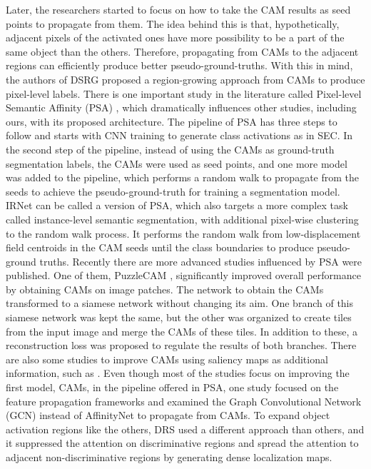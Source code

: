 \documentclass[sn-mathphys]{sn-jnl}
\theoremstyle{thmstyleone}
\theoremstyle{thmstyletwo}\newtheorem{example}{Example}\newtheorem{remark}{Remark}
\theoremstyle{thmstylethree}\newtheorem{definition}{Definition}
\begin{document}
Later, the researchers started to focus on how to take the CAM results as seed points to propagate from them. The idea behind this is that, hypothetically, adjacent pixels of the activated ones have more possibility to be a part of the same object than the others. Therefore, propagating from CAMs to the adjacent regions can efficiently produce better pseudo-ground-truths. With this in mind, the authors of DSRG \cite{huang2018dsrg} proposed a region-growing approach from CAMs to produce pixel-level labels. There is one important study in the literature called Pixel-level Semantic Affinity (PSA) \cite{DBLP:journals/corr/abs-1803-10464}, which dramatically influences other studies, including ours, with its proposed architecture. The pipeline of PSA has three steps to follow and starts with CNN training to generate class activations as in SEC. In the second step of the pipeline, instead of using the CAMs as ground-truth segmentation labels, the CAMs were used as seed points, and one more model was added to the pipeline, which performs a random walk to propagate from the seeds to achieve the pseudo-ground-truth for training a segmentation model. IRNet \cite{DBLP:journals/corr/abs-1904-05044} can be called a version of PSA, which also targets a more complex task called instance-level semantic segmentation, with additional pixel-wise clustering to the random walk process. It performs the random walk from low-displacement field centroids in the CAM seeds until the class boundaries to produce pseudo-ground truths. Recently there are more advanced studies influenced by PSA were published. One of them, PuzzleCAM \cite{jo2021puzzlecam}, significantly improved overall performance by obtaining CAMs on image patches. The network to obtain the CAMs transformed to a siamese network without changing its aim. One branch of this siamese network was kept the same, but the other was organized to create tiles from the input image and merge the CAMs of these tiles. In addition to these, a reconstruction loss was proposed to regulate the results of both branches. There are also some studies to improve CAMs using saliency maps as additional information, such as  \cite{DBLP:journals/corr/abs-2105-08965, DBLP:journals/corr/abs-1910-05475}. Even though most of the studies focus on improving the first model, CAMs, in the pipeline offered in PSA, one study \cite{DBLP:journals/corr/abs-2103-16762} focused on the feature propagation frameworks and examined the Graph Convolutional Network (GCN) instead of AffinityNet to propagate from CAMs. To expand object activation regions like the others, DRS \cite{DBLP:journals/corr/abs-2103-07246} used a different approach than others, and it suppressed the attention on discriminative regions and spread the attention to adjacent non-discriminative regions by generating dense localization maps. 
\end{document}
